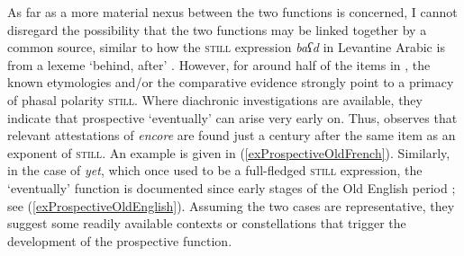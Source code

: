 As far as a more material nexus between the two functions is concerned, I cannot disregard the possibility that the two functions may be linked together by a common source, similar to how the \textsc{still} expression \textit{baʕd} in Levantine Arabic is from a lexeme \lq behind, after\rq{ }\parencite{TaineCheikh2016}. However, for around half of the items in , the known etymologies and/or the comparative evidence strongly point to a primacy of phasal polarity \textsc{still}. Where diachronic investigations are available, they indicate that prospective \lq eventually\rq{ }can arise very early on. Thus, \textcite[146–147]{MosegaardHansen2008} observes that relevant attestations of  \textit{encore} are found just a century after the same item as an exponent of \textsc{still}. An example is given in (\ref{exProspectiveOldFrench}). Similarly, in the case of  \textit{yet}, which once used to be a full-fledged \textsc{still} expression, the \lq eventually\rq{ }function is documented since early stages of the Old English period \parencite{KoenigTraugott1982}; see (\ref{exProspectiveOldEnglish}). Assuming the two cases are representative, they suggest some readily available contexts or constellations that trigger the development of the prospective function.

